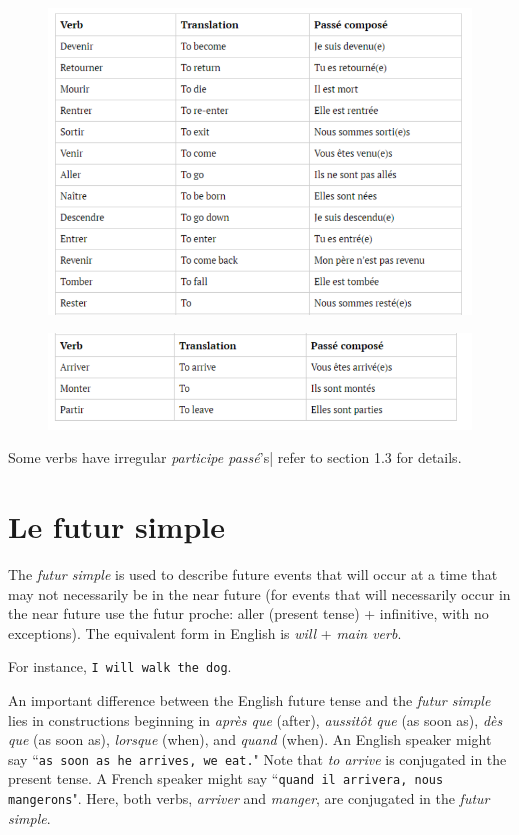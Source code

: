 \documentclass[11pt, oneside]{book}
\begin{document}
{\begin{figure}[H]
	\includegraphics[scale=0.5]{charts/vandertramp.png}
\end{figure}
\begin{figure}[H]
	\includegraphics[scale=0.5]{charts/vandertramp2.png}
\end{figure}

Some verbs have irregular \textit{participe pass\'e}'s| refer to section 1.3
for details.

\section{Le futur simple}

The \textit{futur simple} is used to describe future events that will occur at a time that may not necessarily be in the near future (for events that will necessarily occur in the near future use the futur proche: aller (present tense) + infinitive, with no exceptions). The equivalent form in English is \textit{will} + \textit{main verb}. \vspace{0.5\baselineskip}

	For instance, \texttt{I will walk the dog}. \vspace{0.5\baselineskip}

	An important difference between the English future tense and the \textit{futur simple} lies in constructions beginning in \textit{apr\`es que} (after), \textit{aussit\^ot que} (as soon as), \textit{d\`es que} (as soon as), \textit{lorsque} (when), and \textit{quand} (when). An English speaker might say ``\texttt{as soon as he arrives, we eat.}" Note that \textit{to arrive} is conjugated in the present tense. A French speaker might say ``\texttt{quand il arrivera, nous mangerons}". Here, both verbs, \textit{arriver} and \textit{manger}, are conjugated in the \textit{futur simple}. \vspace{0.5\baselineskip}

}
\end{document}
